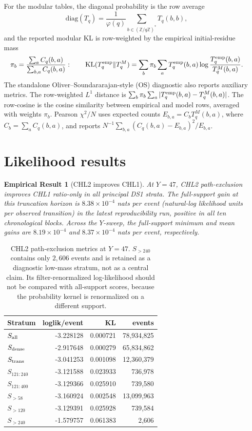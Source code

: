 \documentclass[10pt]{article}
\newtheorem{empirical}{Empirical Result}
\begin{document}
For the modular tables, the diagonal probability is the row average
\[
\mathrm{diag}(T_q)=\frac{1}{\varphi(q)}\sum_{b\in(\mathbb Z/q\mathbb Z)^*}T_q(b,b),
\]
and the reported modular KL is row-weighted by the empirical initial-residue mass
\[
\pi_b=\frac{\sum_a C_q(b,a)}{\sum_{b,a}C_q(b,a)}:
\qquad
\mathrm{KL}(T_q^{\rm emp}\Vert T_q^{M})=
\sum_b \pi_b\sum_a T_q^{\rm emp}(b,a)\log\frac{T_q^{\rm emp}(b,a)}{T_q^{M}(b,a)}.
\]
The standalone Oliver--Soundararajan-style (OS) diagnostic also reports auxiliary metrics.  The row-weighted $L^1$ distance is $\sum_b\pi_b\sum_a |T_q^{\rm emp}(b,a)-T_q^M(b,a)|$.  The row-cosine is the cosine similarity between empirical and model rows, averaged with weights $\pi_b$.  Pearson $\chi^2/N$ uses expected counts $E_{b,a}=C_bT_q^M(b,a)$, where $C_b=\sum_a C_q(b,a)$, and reports $N^{-1}\sum_{b,a}(C_q(b,a)-E_{b,a})^2/E_{b,a}$.
\section{Likelihood results}
\begin{empirical}[CHL2 improves CHL1]
At $Y=47$, CHL2 path-exclusion improves CHL1 ratio-only in all principal DS1 strata.  The full-support gain at this truncation horizon is $8.38\times10^{-4}$ nats per event (natural-log likelihood units per observed transition) in the latest reproducibility run, positive in all ten chronological blocks.  Across the $Y$-sweep, the full-support minimum and mean gains are $8.19\times10^{-4}$ and $8.37\times10^{-4}$ nats per event, respectively.
\end{empirical}

\begin{table}[H]\centering\small
\begin{tabular}{lrrr}
\toprule
Stratum & loglik/event & KL & events \\
\midrule
$S_{\rm all}$ & -3.228128 & 0.000721 & 78,934,825 \\
$S_{\rm dense}$ & -2.917648 & 0.000279 & 65,834,862 \\
$S_{\rm trans}$ & -3.041253 & 0.001098 & 12,360,379 \\
$S_{121:240}$ & -3.121588 & 0.023933 & 736,978 \\
$S_{121:400}$ & -3.129366 & 0.025910 & 739,580 \\
$S_{>58}$ & -3.160924 & 0.002548 & 13,099,963 \\
$S_{>120}$ & -3.129391 & 0.025928 & 739,584 \\
$S_{>240}$ & -1.579757 & 0.061383 & 2,606 \\
\bottomrule
\end{tabular}
\caption{CHL2 path-exclusion metrics at $Y=47$.  $S_{>240}$ contains only $2{,}606$ events and is retained as a diagnostic low-mass stratum, not as a central claim.  Its filter-renormalized log-likelihood should not be compared with all-support scores, because the probability kernel is renormalized on a different support.}
\end{table}
\end{document}
